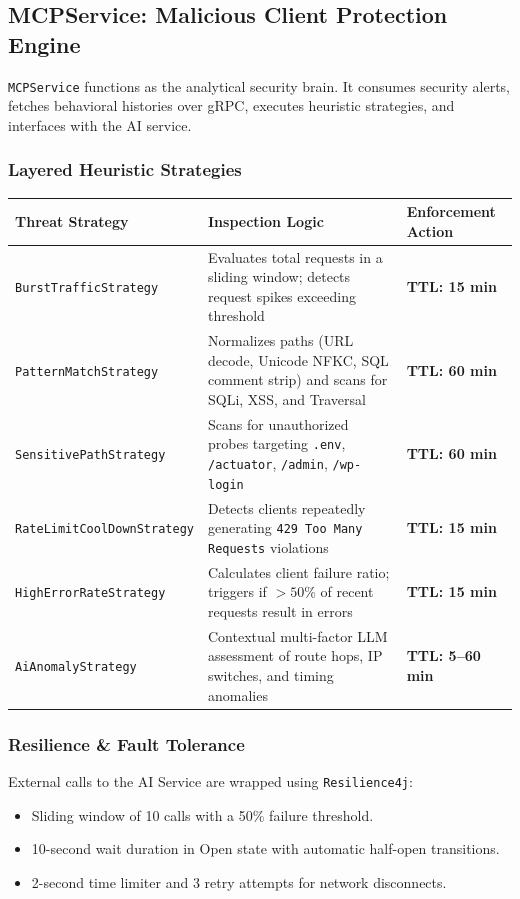 \documentclass[12pt, a4paper]{article}
\newcommand{\tech}[1]{\texttt{\color{accentblue}#1}}
\newcommand{\service}[1]{\texttt{\color{accentteal}#1}}
\newcommand{\critical}[1]{\textbf{\color{criticalred}#1}}
\begin{document}
\subsection{MCPService: Malicious Client Protection Engine}

\service{MCPService} functions as the analytical security brain. It consumes security alerts, fetches behavioral histories over gRPC, executes heuristic strategies, and interfaces with the AI service.

\subsubsection{Layered Heuristic Strategies}
\begin{center}
\small
\begin{tabular}{L{4.8cm} L{6.2cm} C{3.0cm}}
\toprule
{}
\textbf{Threat Strategy} & \textbf{Inspection Logic} & \textbf{Enforcement Action} \\
\midrule
\tech{BurstTrafficStrategy} & Evaluates total requests in a sliding window; detects request spikes exceeding threshold & \critical{TTL: 15 min} \\
\tech{PatternMatchStrategy} & Normalizes paths (URL decode, Unicode NFKC, SQL comment strip) and scans for SQLi, XSS, and Traversal & \critical{TTL: 60 min} \\
\tech{SensitivePathStrategy} & Scans for unauthorized probes targeting \texttt{.env}, \texttt{/actuator}, \texttt{/admin}, \texttt{/wp-login} & \critical{TTL: 60 min} \\
\tech{RateLimitCoolDownStrategy} & Detects clients repeatedly generating \texttt{429 Too Many Requests} violations & \critical{TTL: 15 min} \\
\tech{HighErrorRateStrategy} & Calculates client failure ratio; triggers if $>50\%$ of recent requests result in errors & \critical{TTL: 15 min} \\
\tech{AiAnomalyStrategy} & Contextual multi-factor LLM assessment of route hops, IP switches, and timing anomalies & \critical{TTL: 5--60 min} \\
\bottomrule
\end{tabular}
\end{center}

\subsubsection{Resilience \& Fault Tolerance}
External calls to the AI Service are wrapped using \tech{Resilience4j}:
\begin{itemize}[noitemsep]
    \item Sliding window of 10 calls with a 50\% failure threshold.
    \item 10-second wait duration in Open state with automatic half-open transitions.
    \item 2-second time limiter and 3 retry attempts for network disconnects.
\end{itemize}
\end{document}
